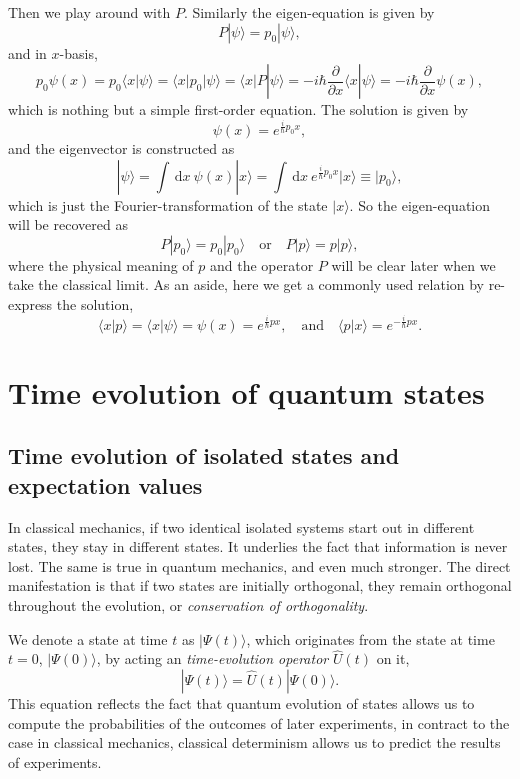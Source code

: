 \documentclass{article}
\newcommand{\be}{\begin{equation}}
\newcommand{\ee}{\end{equation}}
\newcommand{\dif}{\,\mathrm{d}}
\newcommand{\p}{\partial}
\newcommand{\1}{\left}
\newcommand{\2}{\right}
\newcommand{\la}{\langle}
\newcommand{\ra}{\rangle}
\begin{document}
Then we play around with $P$. Similarly the eigen-equation is given by
\be
P|\psi\ra=p_0|\psi\ra,
\ee
and in $x$-basis,
\be
p_0\psi(x)=p_0\la x|\psi\ra=\la x|p_0|\psi\ra=\la x|P|\psi\ra=-i\hbar\frac\p{\p x}\la x|\psi\ra=-i\hbar\frac\p{\p x}\psi(x),
\ee
which is nothing but a simple first-order equation. The solution is given by
\be
\psi(x)=e^{\frac i \hbar p_0 x},
\ee
and the eigenvector is constructed as
\be
|\psi\ra=\int\dif x\ \psi(x)|x\ra=\int\dif x\ e^{\frac i \hbar p_0 x} |x\ra \equiv|p_0\ra,
\ee
which is just the Fourier-transformation of the state $|x\ra$. So the eigen-equation will be recovered as
\be
P|p_0\ra=p_0|p_0\ra \quad\text{or}\quad P|p\ra=p|p\ra,
\ee
where the physical meaning of $p$ and the operator $P$ will be clear later when we take the classical limit. As an aside, here we get a commonly used relation by re-express the solution,
\be
\la x|p\ra=\la x|\psi\ra=\psi(x)=e^{\frac i \hbar p x}, \quad\text{and}\quad \la p|x\ra=e^{-\frac i \hbar p x}.
\ee















\section{Time evolution of quantum states}
\subsection{Time evolution of isolated states and expectation values}

In classical mechanics, if two identical isolated systems start out in different states, they stay in different states. It underlies the fact that information is never lost. The same is true in quantum mechanics, and even much stronger. The direct manifestation is that if two states are initially orthogonal, they remain orthogonal throughout the evolution, or \textit{conservation of orthogonality}.

We denote a state at time $t$ as $|\Psi(t)\ra$, which originates from the state at time $t=0$, $|\Psi(0)\ra$, by acting an \textit{time-evolution operator} $\hat U(t)$ on it,
\be
|\Psi(t)\ra=\hat U(t) |\Psi(0)\ra.
\ee
This equation reflects the fact that quantum evolution of states allows us to compute the probabilities of the outcomes of later experiments, in contract to the case in classical mechanics, classical determinism allows us to predict the results of experiments. 
\end{document}
